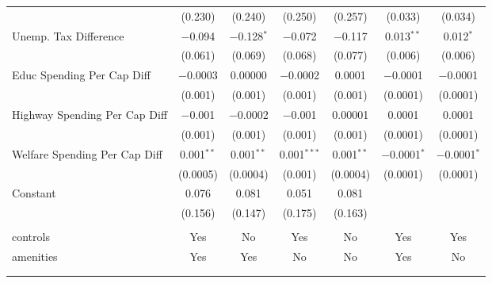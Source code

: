 \begin{table}[!htbp]
\begin{tabular}{@{\extracolsep{5pt}}lcccccc}
  & (0.230) & (0.240) & (0.250) & (0.257) & (0.033) & (0.034) \\ 
  Unemp. Tax Difference & $-$0.094 & $-$0.128$^{*}$ & $-$0.072 & $-$0.117 & 0.013$^{**}$ & 0.012$^{*}$ \\ 
  & (0.061) & (0.069) & (0.068) & (0.077) & (0.006) & (0.006) \\ 
  Educ Spending Per Cap Diff & $-$0.0003 & 0.00000 & $-$0.0002 & 0.0001 & $-$0.0001 & $-$0.0001 \\ 
  & (0.001) & (0.001) & (0.001) & (0.001) & (0.0001) & (0.0001) \\ 
  Highway Spending Per Cap Diff & $-$0.001 & $-$0.0002 & $-$0.001 & 0.00001 & 0.0001 & 0.0001 \\ 
  & (0.001) & (0.001) & (0.001) & (0.001) & (0.0001) & (0.0001) \\ 
  Welfare Spending Per Cap Diff & 0.001$^{**}$ & 0.001$^{**}$ & 0.001$^{***}$ & 0.001$^{**}$ & $-$0.0001$^{*}$ & $-$0.0001$^{*}$ \\ 
  & (0.0005) & (0.0004) & (0.001) & (0.0004) & (0.0001) & (0.0001) \\ 
  Constant & 0.076 & 0.081 & 0.051 & 0.081 &  &  \\ 
  & (0.156) & (0.147) & (0.175) & (0.163) &  &  \\ 
 \hline \\[-1.8ex] 
controls & Yes & No & Yes & No & Yes & Yes \\ 
amenities & Yes & Yes & No & No & Yes & No \\ 
\hline \\[-1.8ex] 
\hline 
\hline \\[-1.8ex] 
\end{tabular} 
\end{table} 
